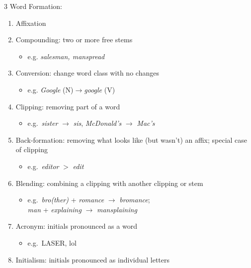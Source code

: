 \documentclass[12pt, a4paper]{article}
\begin{document}
\begin{multicols*}{3}
Word Formation:
\begin{enumerate}[\roman*.]
  \item Affixation
  \item Compounding: two or more free stems
    \begin{itemize}[leftmargin=*]\vspace{3pt}
      \item e.g. \textit{salesman, manspread}
    \end{itemize}
  \item Conversion: change word class with no changes
    \begin{itemize}[leftmargin=*]\vspace{3pt}
    \item e.g. \textit{Google} (N)$\rightarrow$\textit{google} (V)
    \end{itemize}
  \item Clipping: removing part of a word
    \begin{itemize}[leftmargin=*]\vspace{3pt}
      \item e.g.\ \textit{sister} $\rightarrow$ \textit{sis}, \textit{McDonald's} $\rightarrow$ \textit{Mac's}
    \end{itemize}
  \item Back-formation: removing what looks like (but wasn't) an affix; special case of clipping
    \begin{itemize}[leftmargin=*]\vspace{3pt}
      \item e.g.\ \textit{editor} $>$ \textit{edit}
    \end{itemize}
  \item Blending: combining a clipping with another clipping or stem
    \begin{itemize}[leftmargin=*]\vspace{3pt}
      \item e.g.\ \textit{bro(ther)} + \textit{romance} $\to$ \textit{bromance};\\\textit{man} + \textit{explaining} $\to$ \textit{mansplaining}
    \end{itemize}
  \item Acronym: initials pronounced as a word
    \begin{itemize}[leftmargin=*]\vspace{3pt}
      \item e.g.\ LASER, \textipa{[l\textopeno l]} lol
    \end{itemize}
  \item Initialism: initials pronounced as individual letters

\end{enumerate}
\end{multicols*}
\end{document}

